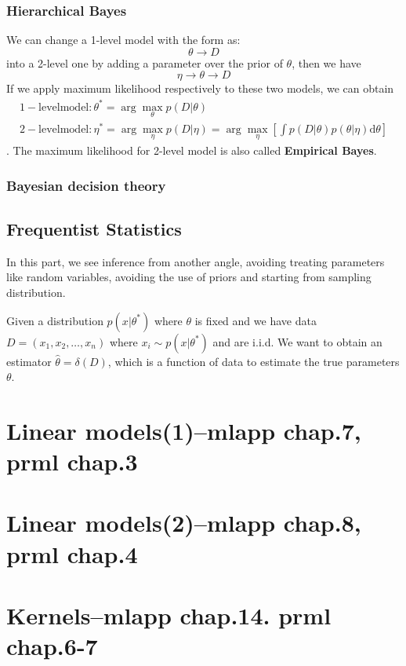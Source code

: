 \documentclass{article}
\newcommand{\mrm}{\mathrm}
\begin{document}
\subsubsection*{Hierarchical Bayes}
We can change a 1-level model with the form as:
\begin{equation}
    \theta \rightarrow D
\end{equation}
into a 2-level one by adding a parameter over the prior of $\theta$, then we have
\begin{equation}
    \eta\rightarrow\theta\rightarrow D
\end{equation}
If we apply maximum likelihood respectively to these two models, we can obtain
\begin{gather}
    \mrm{1-level model: }\theta^*=\arg\max_{\theta}p(D|\theta) \\
    \mrm{2-level model: }\eta^*=\arg\max_\eta p(D|\eta)=\arg\max_{\eta}[\int p(D|\theta)p(\theta|\eta)\mrm d\theta]
\end{gather}.
The maximum likelihood for 2-level model is also called \textbf{Empirical Bayes}.
\subsubsection*{Bayesian decision theory}

\subsection*{Frequentist Statistics}
In this part, we see inference from another angle, avoiding treating parameters like random variables, avoiding the use of priors and starting from sampling distribution. 

Given a distribution $p(x|\theta^*)$ where $\theta$ is fixed and we have data $D=(x_1, x_2, \dots, x_n)$ where $x_i\sim p(x|\theta^*)$ and are i.i.d. We want to obtain an estimator $\hat{\theta}=\delta(D)$, which is a function of data to estimate the true parameters $\theta$. 

\section{Linear models(1)--mlapp chap.7, prml chap.3}

\section{Linear models(2)--mlapp chap.8, prml chap.4}

\section{Kernels--mlapp chap.14. prml chap.6-7}
\end{document}
